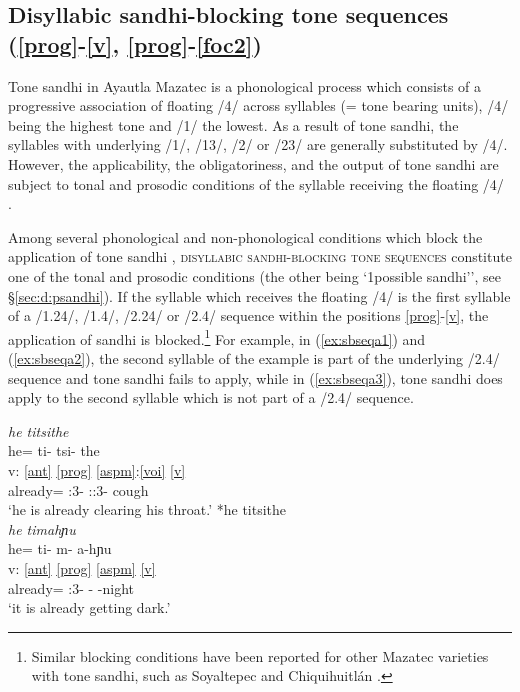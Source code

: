 \documentclass[output=paper]{langscibook}
\begin{document}
\subsection{Disyllabic sandhi-blocking tone sequences (\ref{prog}-\ref{v}, \ref{prog}-\ref{foc2})}\label{sec:d:sandhi1}
Tone sandhi in Ayautla Mazatec is a phonological process which consists of a progressive association of floating /4/ across syllables (= tone bearing units), /4/ being the highest tone and /1/ the lowest. As a result of tone sandhi, the syllables with underlying /1/, /13/, /2/ or /23/ are generally substituted by /4/. However, the applicability, the obligatoriness, and the output of tone sandhi are subject to tonal and prosodic conditions of the syllable receiving the floating /4/ \citep[171--196]{nakamoto20}.

Among several phonological and non-phonological conditions which block the application of tone sandhi \citep[184--191]{nakamoto20}, \textsc{disyllabic sandhi-blocking tone sequences} constitute one of the tonal and prosodic conditions (the other being `1possible sandhi'', see \S\ref{sec:d:psandhi}). If the syllable which receives the floating /4/ is the first syllable of a /1.24/, /1.4/, /2.24/ or /2.4/ sequence within the positions \ref{prog}-\ref{v}, the application of sandhi is blocked.\footnote{Similar blocking conditions have been reported for other Mazatec varieties with tone sandhi, such as Soyaltepec \citep[63--64]{pikee56} and Chiquihuitlán \citep{nakamoto18}.} For example, in (\ref{ex:sbseqa1}) and (\ref{ex:sbseqa2}), the second syllable of the example is part of the underlying /2.4/ sequence and tone sandhi fails to apply, while in (\ref{ex:sbseqa3}), tone sandhi does apply to the second syllable which is not part of a /2.4/ sequence.

\ea \label{ex:sbseq}
\ea  \label{ex:sbseqa1} \textit{he\2 ti\2tsi\4\st{}the\2}\\
\glll {} he\2\ff= ti\2\ff- tsi\4- the\2\\
v: \ref{ant} \ref{prog} \ref{aspm}:\ref{voi} \ref{v}\\
{} already= \Prog:3- \Hab:\Caus:3- cough\\
\glt `he is already clearing his throat.'
\ex \label{ex:sbseqa2} *he\2 ti\4tsi\4\st{}the\2\\
\ex \label{ex:sbseqa3} \textit{he\2 ti\4ma\2\st{}hɲu\4}\\
\glll {} he\2\ff= ti\2\ff- m- a\2-hɲu\4\\
v: \ref{ant} \ref{prog} \ref{aspm} \ref{v}\\
{} already= \Prog:3- \Hab- \Inch-night\\
\glt `it is already getting dark.'
\z
\z
\end{document}
